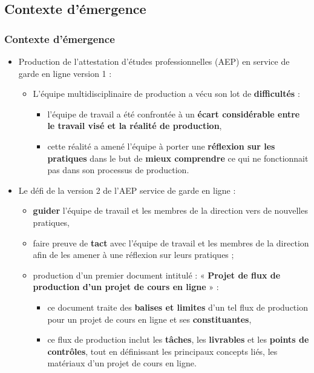                \subsection{Contexte d'émergence} 
		\begin{frame}[allowframebreaks]
			\frametitle{Contexte d'émergence}
			\begin{itemize}
				\item Production de l'attestation d'études professionnelles (AEP) en service de garde en ligne version 1 :
                                  \begin{itemize}
                                    \item L’équipe multidisciplinaire de production a vécu son lot de \textbf{difficultés} :
                                     	\begin{itemize}
                                    	\item l’équipe de travail a été confrontée à un \textbf{écart considérable entre le travail visé et la réalité de production},
                                    	\item cette réalité a amené l’équipe à porter une \textbf{réflexion sur les pratiques} dans le but de \textbf{mieux comprendre} ce qui ne fonctionnait pas dans son processus de production.
                                    	\end{itemize}
                                  \end{itemize}
                                \framebreak
                                \item Le défi de la version 2 de l'AEP service de garde en ligne : 
                                  \begin{itemize}
                                  \item \textbf{guider} l’équipe de travail et les membres de la direction vers de nouvelles pratiques,
                                  \item faire preuve de \textbf{tact} avec l’équipe de travail et les membres de la direction afin de les amener à une réflexion sur leurs pratiques ; 
                                  \item production d'un premier document intitulé : « \textbf{Projet de flux de production d’un projet de cours en ligne} » :
                                    \begin{itemize}
                                      \item ce document traite des \textbf{balises et limites} d’un tel flux de production pour un projet de cours en ligne et ses \textbf{constituantes},
                                      \item ce flux de production inclut les\textbf{ tâches}, les \textbf{livrables} et les \textbf{points de contrôles}, tout en définissant les principaux concepts liés, les matériaux d’un projet de cours en ligne.
                                         

\end{itemize}
\end{itemize}
\end{itemize}
\end{frame}
